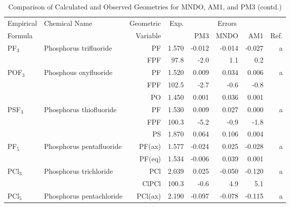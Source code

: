 \begin{table}
\caption{\label{geotabt}Comparison of Calculated and Observed Geometries for 
MNDO, AM1, and PM3 (contd.)}
\begin{center}
\compresstable
\begin{tabular}{llrrrrrr}
 Empirical  & Chemical Name &  Geometric &  Exp. & \multicolumn{3}{c}{Errors} & \\
  Formula   &               &  Variable &        & PM3  & MNDO  &  AM1 & Ref.\\
\hline
 PF$_3$         & Phosphorus trifluoride             &PF             &     1.570   &    -0.012 &    -0.014 &    -0.027 &     a \\
             &                                    &FPF          &      97.8   &      -2.0 &       1.1 &       0.2   &       \\
 POF$_3$        & Phosphous oxyfluoride              &PF             &     1.520   &     0.009 &     0.034 &     0.006 &     a \\
             &                                    &FPF          &     102.5   &      -2.7 &      -0.6 &      -0.8   &       \\
             &                                    &PO             &     1.450   &     0.001 &     0.036 &     0.001 &       \\
 PSF$_3$        & Phosphorus thiofluoride            &PF             &     1.530   &     0.009 &     0.027 &     0.000 &     a \\
             &                                    &FPF          &     100.3   &      -5.2 &      -0.9 &      -1.8   &       \\
             &                                    &PS             &     1.870   &     0.064 &     0.106 &     0.004 &       \\
 PF$_5$         & Phosphorus pentafluoride           &PF(ax)         &     1.577   &    -0.024 &     0.025 &    -0.028 &     a \\
             &                                    &PF(eq)         &     1.534   &    -0.006 &     0.039 &     0.001 &       \\
 PCl$_3$        & Phosphorus trichloride             &PCl            &     2.039   &     0.025 &    -0.050 &    -0.120 &     a \\
             &                                    &ClPCl        &     100.3   &      -0.6 &       4.9 &       5.1   &       \\
 PCl$_5$        & Phosphorus pentachloride           &PCl(ax)        &     2.190   &    -0.097 &    -0.078 &    -0.115 &     a \\

\end{tabular}
\end{center}
\end{table}
